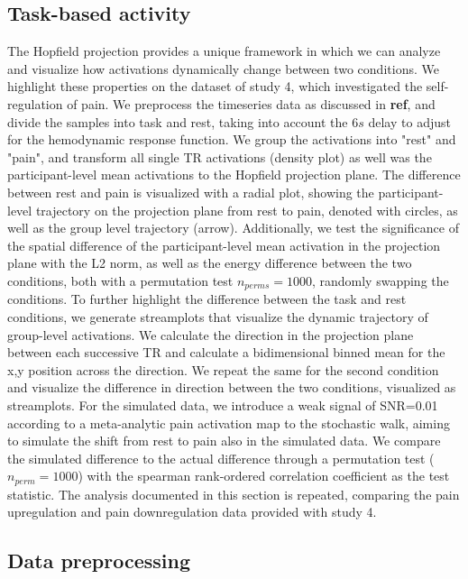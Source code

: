 \documentclass{article}
\begin{document}
\subsection{Task-based activity}\label{Task-based activity}

The Hopfield projection provides a unique framework in which we can analyze and visualize how activations dynamically
change between two conditions. We highlight these properties on the dataset of study 4, which investigated
the self-regulation of pain. We preprocess the timeseries data as discussed in \textbf{ref}, and divide the samples into
task and rest, taking into account the $6 s$ delay to adjust for the hemodynamic response function.
We group the activations into "rest" and "pain", and transform all single TR activations (density plot) as well was the
participant-level mean activations to the Hopfield projection plane.
The difference between rest and pain is visualized with a radial plot, showing the participant-level trajectory on
the projection plane from rest to pain, denoted with circles, as well as the group level trajectory (arrow).
Additionally, we test the significance of the spatial difference of the participant-level mean activation in
the projection plane with the L2 norm,
as well as the energy difference between the two conditions, both with a permutation test $n_{perms}=1000$,
randomly swapping the conditions.
To further highlight the difference between the task and rest conditions, we generate streamplots that visualize the
dynamic trajectory of group-level activations.
We calculate the direction in the projection plane between each successive TR and calculate a bidimensional binned
mean for the x,y position across the direction.
We repeat the same for the second condition and visualize the difference in direction between the two conditions,
visualized as streamplots.
For the simulated data, we introduce a weak signal of SNR=0.01 according to a meta-analytic pain activation map
\citep{zunhammer2021meta} to the stochastic walk, aiming to simulate the shift from rest to pain also in the
simulated data. We compare the simulated difference to the actual difference through a permutation test
($n_{perm}=1000$) with the spearman rank-ordered correlation coefficient as the test statistic.
The analysis documented in this section is repeated, comparing the pain upregulation and pain downregulation
data provided with study 4.

\subsection{Data preprocessing}\label{Data preprocessing}
\end{document}
